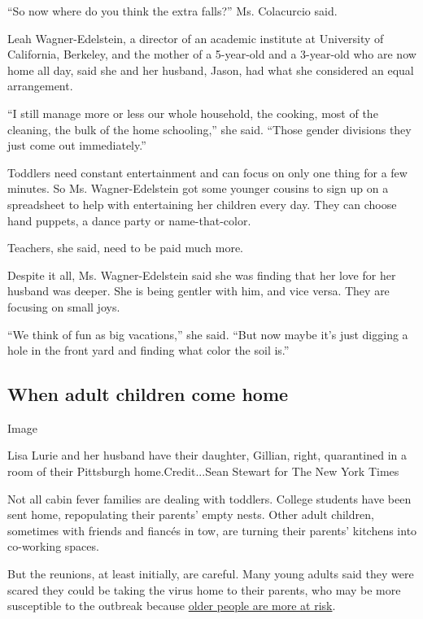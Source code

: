 ``So now where do you think the extra falls?'' Ms. Colacurcio said.

Leah Wagner-Edelstein, a director of an academic institute at University
of California, Berkeley, and the mother of a 5-year-old and a 3-year-old
who are now home all day, said she and her husband, Jason, had what she
considered an equal arrangement.

``I still manage more or less our whole household, the cooking, most of
the cleaning, the bulk of the home schooling,'' she said. ``Those gender
divisions they just come out immediately.''

Toddlers need constant entertainment and can focus on only one thing for
a few minutes. So Ms. Wagner-Edelstein got some younger cousins to sign
up on a spreadsheet to help with entertaining her children every day.
They can choose hand puppets, a dance party or name-that-color.

Teachers, she said, need to be paid much more.

Despite it all, Ms. Wagner-Edelstein said she was finding that her love
for her husband was deeper. She is being gentler with him, and vice
versa. They are focusing on small joys.

``We think of fun as big vacations,'' she said. ``But now maybe it's
just digging a hole in the front yard and finding what color the soil
is.''

\hypertarget{when-adult-children-come-home}{%
\subsection{When adult children come
home}\label{when-adult-children-come-home}}

Image

Lisa Lurie and her husband have their daughter, Gillian, right,
quarantined in a room of their Pittsburgh home.Credit...Sean Stewart for
The New York Times

Not all cabin fever families are dealing with toddlers. College students
have been sent home, repopulating their parents' empty nests. Other
adult children, sometimes with friends and fiancés in tow, are turning
their parents' kitchens into co-working spaces.

But the reunions, at least initially, are careful. Many young adults
said they were scared they could be taking the virus home to their
parents, who may be more susceptible to the outbreak because
\href{https://www.nytimes3xbfgragh.onion/2020/03/14/health/coronavirus-elderly-protection.html}{older
people are more at risk}.

